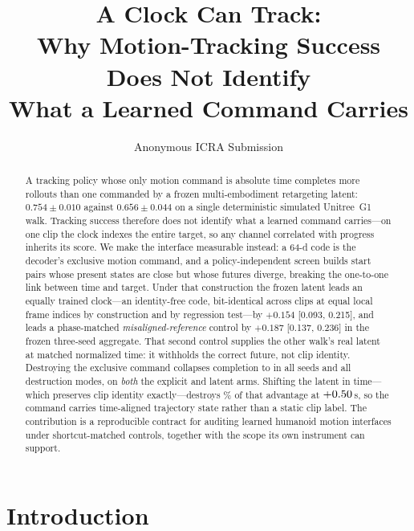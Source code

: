 \documentclass[conference]{IEEEtran}
\title{A Clock Can Track:\\Why Motion-Tracking Success Does Not Identify\\What a Learned Command Carries}
\author{Anonymous ICRA Submission}
\newcommand{\EEndpointLabel}{frozen three-seed aggregate}%
\newcommand{\EATDifference}{+0.154}
\newcommand{\EATCILow}{0.093}
\newcommand{\EATCIHigh}{0.215}
\newcommand{\EASDifference}{+0.187}
\newcommand{\EASCILow}{0.137}
\newcommand{\EASCIHigh}{0.236}
\newcommand{\EEndpointLabel}{frozen seed-0 endpoint}%
\begin{document}
\maketitle

\begin{abstract}
A tracking policy whose only motion command is absolute time completes more rollouts than
one commanded by a frozen multi-embodiment retargeting latent: $0.754\pm0.010$ against
$0.656\pm0.044$ on a single deterministic simulated Unitree~G1 walk.  Tracking success
therefore does not identify what a learned command carries---on one clip the clock indexes
the entire target, so any channel correlated with progress inherits its score.  We make the
interface measurable instead: a 64-d code is the decoder's exclusive motion command, and a
policy-independent screen builds \ESelectedWindows{} start pairs whose present states are
close but whose futures diverge, breaking the one-to-one link between time and target.
Under that construction the frozen latent leads an equally trained clock---an
identity-free code, bit-identical across clips at equal local frame indices by construction
and by regression test---by $\EATDifference$ [\EATCILow, \EATCIHigh], and leads a
phase-matched \emph{misaligned-reference} control by $\EASDifference$ [\EASCILow,
\EASCIHigh] in the \EEndpointLabel.  That second control supplies the other walk's real
latent at matched normalized time: it withholds the correct future, not clip identity.  Destroying the exclusive
command collapses completion to \EDestroyCompletion{} in all \EDestroySeeds{} seeds and all
\EDestroyModes{} destruction modes, on \emph{both} the explicit and latent arms.  Shifting
the latent in time---which preserves clip identity exactly---destroys
\EPhaseShiftPlusHalfLostPercent\% of that advantage at $+0.50$\,s,
so the command carries time-aligned trajectory state rather than a static clip label.  The
contribution is a reproducible contract for auditing learned humanoid motion interfaces
under shortcut-matched controls, together with the scope its own instrument can support.
\end{abstract}



\section{Introduction}
\end{document}
